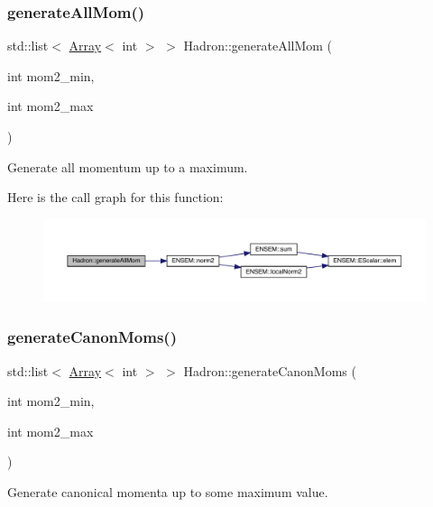 \subsubsection{\texorpdfstring{generateAllMom()}{generateAllMom()}}
{\footnotesize\ttfamily std\+::list$<$ \mbox{\hyperlink{classXMLArray_1_1Array}{Array}}$<$ int $>$ $>$ Hadron\+::generate\+All\+Mom (\begin{DoxyParamCaption}\item[{int}]{mom2\+\_\+min,  }\item[{int}]{mom2\+\_\+max }\end{DoxyParamCaption})}



Generate all momentum up to a maximum. 

Here is the call graph for this function\+:\nopagebreak
\begin{figure}[H]
\begin{center}
\leavevmode
\includegraphics[width=350pt]{d1/daf/namespaceHadron_aa0ad60c011c7668c5389ce9286b3c8dd_cgraph}
\end{center}
\end{figure}
\mbox{\label{namespaceHadron_af42e0a1c54e10b67abac83c56c67b40e}} 
\subsubsection{\texorpdfstring{generateCanonMoms()}{generateCanonMoms()}}
{\footnotesize\ttfamily std\+::list$<$ \mbox{\hyperlink{classXMLArray_1_1Array}{Array}}$<$ int $>$ $>$ Hadron\+::generate\+Canon\+Moms (\begin{DoxyParamCaption}\item[{int}]{mom2\+\_\+min,  }\item[{int}]{mom2\+\_\+max }\end{DoxyParamCaption})}



Generate canonical momenta up to some maximum value. 

